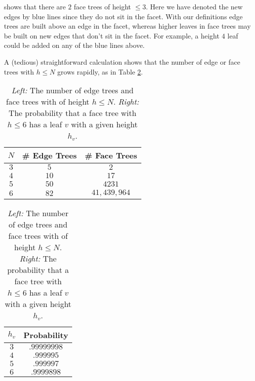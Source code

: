 \documentclass[aps,prl,twocolumn, superscriptaddress,groupedaddress,nofootinbib]{revtex4-1}
\begin{document}
shows that there are $2$ face trees of height $\leq 3$. Here we have denoted the new edges by blue lines since they do
not sit in the facet. With our definitions edge trees are built above an edge
in the facet, whereas higher leaves in face trees may be built on new edges
that don't sit in the facet. For example, a height $4$ leaf could be added
on any of the blue lines above.




A (tedious) straightforward calculation shows that the number of
edge or face trees with $h \leq N$ grows rapidly, as in
Table \ref{tab:numedgefacetreeandprob}.%
\begin{table}
\begin{tabular}{|c|c|c|}
\hline
$N$ & \# Edge Trees & \# Face Trees \\ \hline
$3$ & $5$ & $2$\\
$4$ & $10$ & $17$\\
$5$ & $50$ & $4231$ \\
$6$ & $82$ & $41,439,964$\\ \hline
\end{tabular} \hspace{1cm}
\begin{tabular}{|c|c|}
\hline
$h_v$ & Probability \\ \hline
$3$ & $.99999998$ \\
$4$ & $.999995$ \\
$5$ & $.999997$  \\
$6$ & $.9999898$ \\ \hline
\end{tabular}
\caption{\emph{Left:} The number of edge trees and face trees with of height $h\leq N$.
\emph{Right:} The probability that a face tree with $h\leq 6$ has a leaf $v$ with
a given height $h_v$.}
\label{tab:numedgefacetreeandprob}
\end{table}

\end{document}
